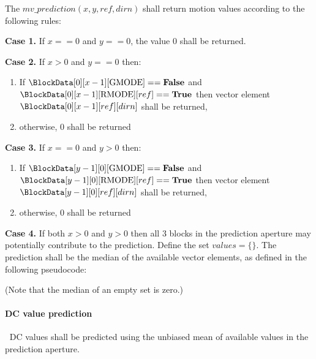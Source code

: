 The $mv\_prediction(x, y, ref, dirn)$ shall return motion values according to
the following rules:

{\bf Case 1.}  If $x==0$ and $y==0$, the value $0$ shall be returned.

{\bf Case 2.} If $x>0$ and $y==0$ then:
\begin{enumerate}
   \item If  $\BlockData[0][x-1][\GMode]==\false$  and 
$\BlockData[0][x-1][\RMode][ref]==\true$ then vector element $\BlockData[0][x-1][ref][dirn]$ shall be returned,
   \item otherwise, $0$ shall be returned
\end{enumerate}

{\bf Case 3.} If $x==0$ and $y>0$ then:
\begin{enumerate}
   \item If  $\BlockData[y-1][0][\GMode]==\false$ and 
$\BlockData[y-1][0][\RMode][ref]==\true$ then vector element 
$\BlockData[y-1][0][ref][dirn]$ shall be returned,
   \item otherwise, $0$ shall be returned
\end{enumerate}

{\bf Case 4.} If both $x>0$ and $y>0$ then all 3 blocks in the prediction aperture 
may potentially contribute to the prediction. Define the set $values=\{\}$. The prediction 
shall be the median of the available vector elements, as defined in the following
pseudocode:

\begin{pseudo*}
    \bsIF{\BlockData[y][x-1][\GMode]==\false}
        \bsIF{\BlockData[y][x-1][\RMode][ref]==\true}
        \bsEND
    \bsEND
    \bsIF{\BlockData[y-1][x][\GMode]==\false}
        \bsIF{\BlockData[y-1][x][\RMode][ref]==\true}
        \bsEND
    \bsEND
    \bsIF{\BlockData[y-1][x-1][\GMode]==\false}
        \bsIF{\BlockData[y-1][x-1][\RMode][ref]==\true}
        \bsEND
    \bsEND

\bsEND
\end{pseudo*}

(Note that the median of an empty set is zero.)

\paragraph{DC value prediction}
\label{dcprediction}
$\ $\newline
DC values shall be predicted using the unbiased mean of available values 
in the prediction aperture. 

